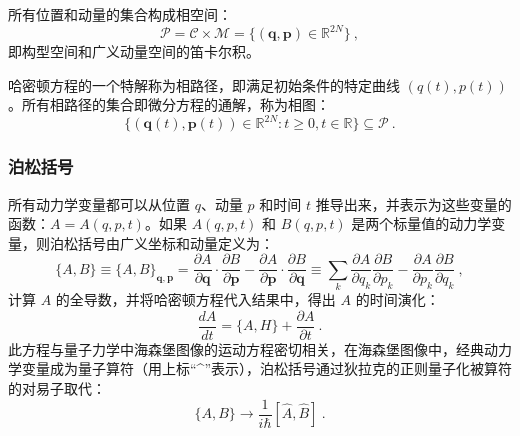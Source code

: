 所有位置和动量的集合构成相空间：
\[
\mathcal{P} = \mathcal{C} \times \mathcal{M} = \{ (\mathbf{q}, \mathbf{p}) \in \mathbb{R}^{2N} \} ~,
\]
即构型空间和广义动量空间的笛卡尔积。

哈密顿方程的一个特解称为相路径，即满足初始条件的特定曲线 \((q(t), p(t))\)。所有相路径的集合即微分方程的通解，称为相图：
\[
\{ (\mathbf{q}(t), \mathbf{p}(t)) \in \mathbb{R}^{2N} : t \geq 0, t \in \mathbb{R} \} \subseteq \mathcal{P} ~.
\]
\subsubsection{泊松括号}  
所有动力学变量都可以从位置 \( q \)、动量 \( p \) 和时间 \( t \) 推导出来，并表示为这些变量的函数：\( A = A(q, p, t) \)。如果 \( A(q, p, t) \) 和 \( B(q, p, t) \) 是两个标量值的动力学变量，则泊松括号由广义坐标和动量定义为：
\[
\{A, B\} \equiv \{A, B\}_{\mathbf{q}, \mathbf{p}} = \frac{\partial A}{\partial \mathbf{q}} \cdot \frac{\partial B}{\partial \mathbf{p}} - \frac{\partial A}{\partial \mathbf{p}} \cdot \frac{\partial B}{\partial \mathbf{q}} \equiv \sum_k \frac{\partial A}{\partial q_k} \frac{\partial B}{\partial p_k} - \frac{\partial A}{\partial p_k} \frac{\partial B}{\partial q_k} ~,
\]
计算 \( A \) 的全导数，并将哈密顿方程代入结果中，得出 \( A \) 的时间演化：
\[
\frac{dA}{dt} = \{A, H\} + \frac{\partial A}{\partial t} ~.
\]
此方程与量子力学中海森堡图像的运动方程密切相关，在海森堡图像中，经典动力学变量成为量子算符（用上标“^”表示），泊松括号通过狄拉克的正则量子化被算符的对易子取代：
\[
\{A, B\} \rightarrow \frac{1}{i \hbar} [\hat{A}, \hat{B}] ~.
\]
